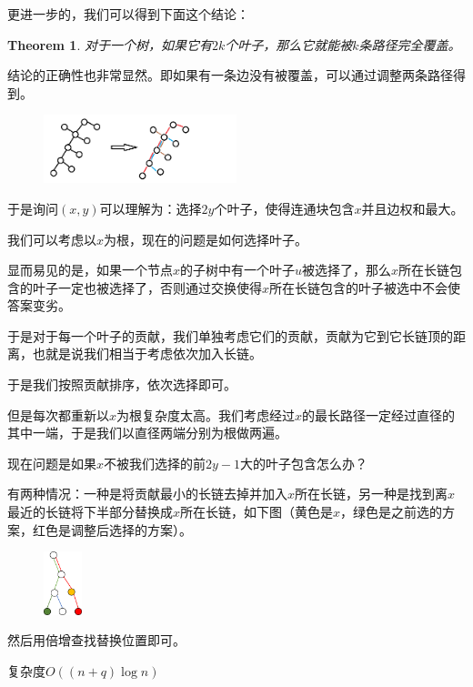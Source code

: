 \documentclass[12pt]{article}
\newtheorem{theorem}{Theorem}
\begin{document}
更进一步的，我们可以得到下面这个结论：

\begin{theorem}
  对于一个树，如果它有$2k$个叶子，那么它就能被$k$条路径完全覆盖。
\end{theorem}

结论的正确性也非常显然。即如果有一条边没有被覆盖，可以通过调整两条路径得到。
\begin{figure}[h]
  \centering
  \includegraphics[width=0.5\textwidth]{p2.png}
  \label{p2}
\end{figure}

于是询问$(x,y)$可以理解为：选择$2y$个叶子，使得连通块包含$x$并且边权和最大。

我们可以考虑以$x$为根，现在的问题是如何选择叶子。

显而易见的是，如果一个节点$x$的子树中有一个叶子$u$被选择了，那么$x$所在长链包含的叶子一定也被选择了，否则通过交换使得$x$所在长链包含的叶子被选中不会使答案变劣。

于是对于每一个叶子的贡献，我们单独考虑它们的贡献，贡献为它到它长链顶的距离，也就是说我们相当于考虑依次加入长链。

于是我们按照贡献排序，依次选择即可。

但是每次都重新以$x$为根复杂度太高。我们考虑经过$x$的最长路径一定经过直径的其中一端，于是我们以直径两端分别为根做两遍。

现在问题是如果$x$不被我们选择的前$2y-1$大的叶子包含怎么办？

有两种情况：一种是将贡献最小的长链去掉并加入$x$所在长链，另一种是找到离$x$最近的长链将下半部分替换成$x$所在长链，如下图（黄色是$x$，绿色是之前选的方案，红色是调整后选择的方案）。

\begin{figure}[h]
  \centering
  \includegraphics[width=0.1\textwidth]{p7.png}
  \label{p3}
\end{figure}

然后用倍增查找替换位置即可。

复杂度$O((n+q)\log n)$
\end{document}
